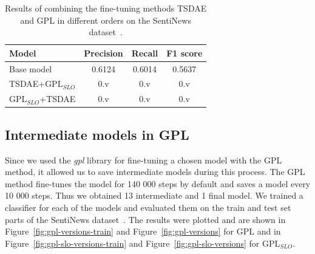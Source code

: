 \documentclass[fleqn,moreauthors,10pt]{ds_report}
\begin{document}
\begin{table}[!h]
	\footnotesize
	\begin{center}
		\begin{tabular}{ |l|c|c|c| }
		\hline
		\rowcolor{Blue}Model & Precision & Recall & F1 score\\
		\hline

		Base model & 0.6124 & 0.6014 & 0.5637\\
		TSDAE+$\text{GPL}_{SLO}$ & 0.v & 0.v & 0.v\\
		$\text{GPL}_{SLO}$+TSDAE &  0.v & 0.v & 0.v\\

		\hline
		\end{tabular}
	\end{center}
\caption{Results of combining the fine-tuning methods TSDAE and GPL in different orders on the SentiNews dataset~\cite{sentiNews}.}
\label{tab3}
\end{table}



\subsection*{Intermediate models in GPL}
\label{intermediate-paraphrase}
Since we used the \textit{gpl} library for fine-tuning a chosen model with the GPL method, it allowed us to save intermediate models during this process. The GPL method fine-tunes the model for 140 000 steps by default and saves a model every 10 000 steps. Thus we obtained 13 intermediate and 1 final model. We trained a classifier for each of the models and evaluated them on the train and test set parts of the SentiNews dataset~\cite{sentiNews}. The results were plotted and are shown in Figure~\ref{fig:gpl-versions-train} and Figure~\ref{fig:gpl-versions} for GPL and in Figure~\ref{fig:gpl-slo-versions-train} and Figure~\ref{fig:gpl-slo-versions} for $\text{GPL}_{SLO}$.
\end{document}
